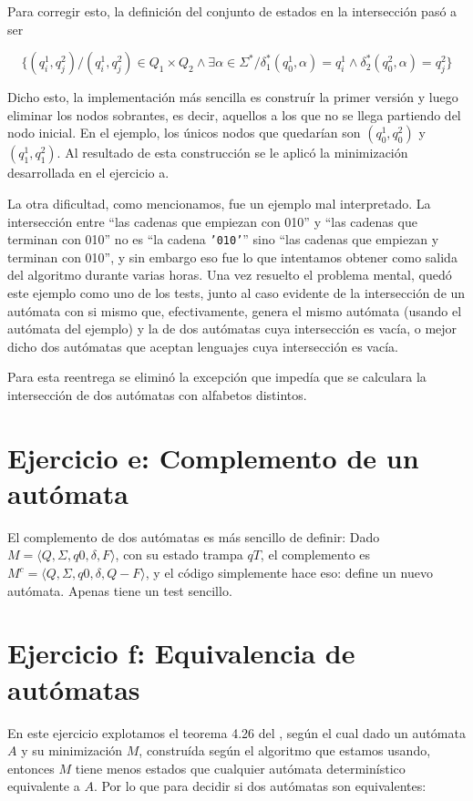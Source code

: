 \documentclass{article}
\begin{document}
Para corregir esto, la definición del conjunto de estados en la intersección pasó a ser

$$
\{(q^1_i, q^2_j) / (q^1_i, q^2_j) \in Q_1 \times Q_2 \wedge \exists \alpha \in \Sigma^* / \delta_1^*(q^1_0, \alpha) = q^1_i \wedge  \delta_2^*(q^2_0, \alpha) = q^2_j \}
$$

Dicho esto, la implementación más sencilla es construír la primer versión y luego eliminar los nodos
sobrantes, es decir, aquellos a los que no se llega partiendo del nodo inicial.  En el ejemplo, los
únicos nodos que quedarían son $(q^1_0, q^2_0)$ y $(q^1_1, q^2_1)$.  Al resultado de esta
construcción se le aplicó la minimización desarrollada en el ejercicio a.

La otra dificultad, como mencionamos, fue un ejemplo mal interpretado.  La intersección entre ``las
cadenas que empiezan con 010'' y ``las cadenas que terminan con 010'' no es ``la cadena
\texttt{'010'}'' sino ``las cadenas que empiezan y terminan con 010'', y sin embargo eso fue lo que
intentamos obtener como salida del algoritmo durante varias horas.  Una vez resuelto el problema
mental, quedó este ejemplo como uno de los tests, junto al caso evidente de la intersección de un
autómata con si mismo que, efectivamente, genera el mismo autómata (usando el autómata del ejemplo)
y la de dos autómatas cuya intersección es vacía, o mejor dicho dos autómatas que aceptan lenguajes
cuya intersección es vacía.

Para esta reentrega se eliminó la excepción que impedía que se calculara la intersección de dos
autómatas con alfabetos distintos.
\section*{Ejercicio e: Complemento de un autómata}
El complemento de dos autómatas es más sencillo de definir: Dado $M = \langle Q, \Sigma, q0, \delta, F \rangle$, con su estado trampa $qT$, el complemento es $M^c = \langle Q, \Sigma, q0, \delta, Q - F \rangle$, y el código simplemente hace eso: define un nuevo autómata.  Apenas tiene un test sencillo.

\section*{Ejercicio f: Equivalencia de autómatas}

En este ejercicio explotamos el teorema 4.26 del \Hopcroft,  según el cual dado un autómata $A$ y su minimización $M$, construída según el algoritmo que estamos usando, entonces $M$ tiene menos estados que cualquier autómata determinístico equivalente a $A$.  Por lo que para decidir si dos autómatas son equivalentes:
\end{document}

